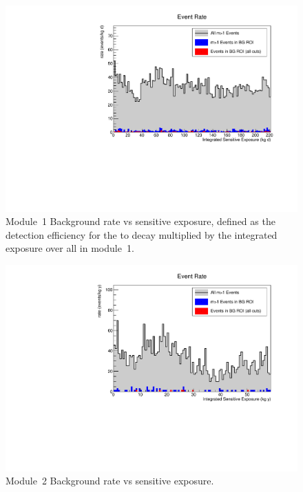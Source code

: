 \documentclass[/main.tex]{subfiles}
\begin{document}
\begin{figure}
  \centering
  \includegraphics[width=.8\linewidth]{M1datarate}
  \caption{
    Module~1 Background rate vs sensitive exposure, defined as the detection efficiency for the \bbes to  decay multiplied by the integrated exposure over all  in module~1.
    }
\end{figure}
\begin{figure}
  \centering
  \includegraphics[width=.8\linewidth]{M2datarate}
  \caption{
    Module~2 Background rate vs sensitive exposure.
    }
\end{figure}
\end{document}
